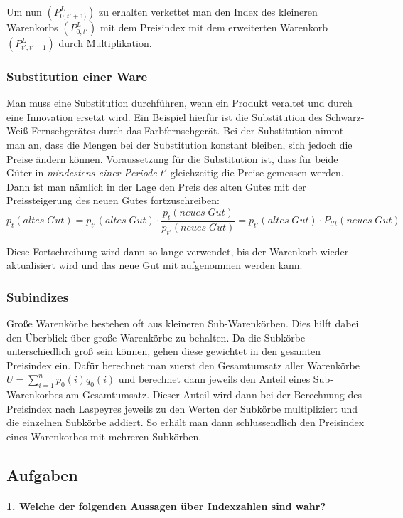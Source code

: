 \documentclass[a4paper]{article}
\begin{document}
\noindent Um nun $(P^L_{0,t'+1)})$ zu erhalten verkettet man den Index des kleineren Warenkorbs $(P^L_{0,t'})$ mit dem Preisindex mit dem erweiterten Warenkorb $(P^L_{t',t'+1})$ durch Multiplikation.

\subsubsection{Substitution einer Ware}
Man muss eine Substitution durchführen, wenn ein Produkt veraltet und durch eine Innovation ersetzt wird. Ein Beispiel hierfür ist die Substitution des Schwarz-Weiß-Fernsehgerätes durch das Farbfernsehgerät. Bei der Substitution nimmt man an, dass die Mengen bei der Substitution konstant bleiben, sich jedoch die Preise ändern können. Voraussetzung für die Substitution ist, dass für beide Güter in \textit{mindestens einer Periode $t'$} gleichzeitig die Preise gemessen werden. Dann ist man nämlich in der Lage den Preis des alten Gutes mit der Preissteigerung des neuen Gutes fortzuschreiben:
$$p_t(altes\; Gut) = p_{t'}(altes\; Gut) \cdot \frac{p_{t}(neues\; Gut)}{p_{t'}(neues\; Gut)} = p_{t'}(altes\; Gut) \cdot P_{t't}(neues\; Gut)$$

\noindent Diese Fortschreibung wird dann so lange verwendet, bis der Warenkorb wieder aktualisiert wird und das neue Gut mit aufgenommen werden kann.

\subsubsection{Subindizes}
Große Warenkörbe bestehen oft aus kleineren Sub-Warenkörben. Dies hilft dabei den Überblick über große Warenkörbe zu behalten. Da die Subkörbe unterschiedlich groß sein können, gehen diese gewichtet in den gesamten Preisindex ein. Dafür berechnet man zuerst den Gesamtumsatz aller Warenkörbe $U=\sum_{i=1}^n p_0(i)q_0(i)$ und berechnet dann jeweils den Anteil eines Sub-Warenkorbes am Gesamtumsatz. Dieser Anteil wird dann bei der Berechnung des Preisindex nach Laspeyres jeweils zu den Werten der Subkörbe multipliziert und die einzelnen Subkörbe addiert. So erhält man dann schlussendlich den Preisindex eines Warenkorbes mit mehreren Subkörben.

\clearpage

\subsection{Aufgaben}

\paragraph{1. Welche der folgenden Aussagen über Indexzahlen sind wahr?}
\end{document}
